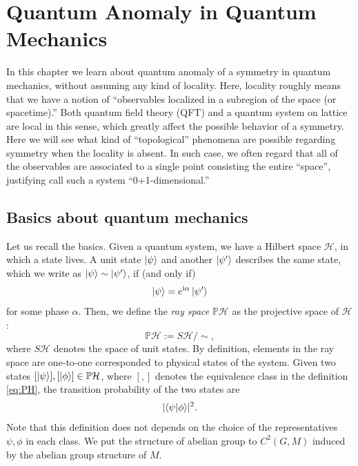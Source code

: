 \documentclass[
]{scrartcl}
\numberwithin{equation}{section}
\theoremstyle{definition}
\theoremstyle{definition}
\theoremstyle{definition}
\theoremstyle{definition}
\theoremstyle{remark}
\begin{document}
\hypertarget{quantum-anomaly-in-quantum-mechanics}{%
\section{Quantum Anomaly in Quantum Mechanics}\label{quantum-anomaly-in-quantum-mechanics}}

In this chapter we learn about quantum anomaly of a symmetry in quantum mechanics, without assuming any kind of locality.
Here, locality roughly means that we have a notion of ``observables localized in a subregion of the space (or spacetime).''
Both quantum field theory (QFT) and a quantum system on lattice are local in this sense, which greatly affect the possible behavior of a symmetry.
Here we will see what kind of ``topological'' phenomena are possible regarding symmetry when the locality is absent.
In such case, we often regard that all of the observables are associated to a single point consisting the entire ``space'', justifying call such a system ``0+1-dimensional.''

\hypertarget{basics-about-quantum-mechanics}{%
\subsection{Basics about quantum mechanics}\label{basics-about-quantum-mechanics}}

Let us recall the basics.
Given a quantum system, we have a Hilbert space \(\mathcal{H}\),
in which a state lives.
A unit state \(\ket{\psi}\) and another \(\ket{\psi'}\) describes the same state, which we write as \(\ket{\psi}\sim\ket{\psi'}\), if (and only if)
\begin{equation}
  \label{eq:phase-equiv}
  \ket{\psi} = e^{\mathrm{i}\alpha}\ket{\psi'}
\end{equation}
for some phase \(\alpha\).
Then, we define the \emph{ray space} \(\mathbb{P}\mathcal{H}\) as the projective space of \(\mathcal{H}\):
\begin{equation}
  \label{eq:PH}
  \mathbb{P}\mathcal{H} := S\mathcal{H}/\sim,
\end{equation}
where \(S\mathcal{H}\) denotes the space of unit states.
By definition, elements in the ray space are one-to-one corresponded to physical states of the system.
Given two states \([\ket{\psi}],[\ket{\phi}] \in \mathbb{P}\mathcal{H}\), where \([,]\) denotes the equivalence class in the definition \eqref{eq:PH}, the transition probability of the two states are
\begin{equation}
  \label{eq:transprob}
  \lvert \braket{\psi|\phi}\rvert^2.
\end{equation}
Note that this definition does not depends on the choice of the representatives \(\psi,\phi\) in each class.
We put the structure of abelian group to \(C^2(G,M)\) induced by the abelian group structure of \(M\).
\end{document}

